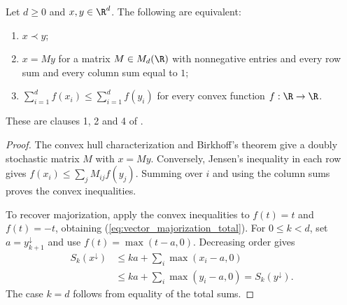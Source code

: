 \begin{theorem}
    \label{thm:vector_majorization_equivalences}
    \leanok
    Let $d\geq 0$ and $x,y\in\R^d$. The following are equivalent:
    \begin{enumerate}
        \item $x\prec y$;
        \item $x=My$ for a matrix $M\in M_d(\R)$ with nonnegative
            entries and every row sum and every column sum equal to $1$;
        \item $\sum_{i=1}^d f(x_i)\leq\sum_{i=1}^d f(y_i)$ for every
            convex function $f:\R\to\R$.
    \end{enumerate}
    These are clauses 1, 2 and 4 of
    \cite[Theorem~8.4]{Wolf2012Quantum}.
\end{theorem}
\begin{proof}\leanok
    The convex hull characterization and Birkhoff's theorem give a
    doubly stochastic matrix $M$ with $x=My$. Conversely, Jensen's
    inequality in each row gives $f(x_i)\leq\sum_j M_{ij}f(y_j)$.
    Summing over $i$ and using the column sums proves the convex inequalities.

    To recover majorization, apply the convex inequalities to $f(t)=t$
    and $f(t)=-t$, obtaining (\ref{eq:vector_majorization_total}).
    For $0\leq k<d$, set $a=y^\downarrow_{k+1}$ and use
    $f(t)=\max(t-a,0)$. Decreasing order gives
    \begin{align*}
        S_k(x^\downarrow)
        &\leq ka+\sum_i\max(x_i-a,0)\\
        &\leq ka+\sum_i\max(y_i-a,0)=S_k(y^\downarrow).
    \end{align*}
    The case $k=d$ follows from equality of the total sums.
\end{proof}

